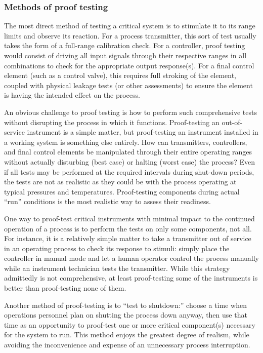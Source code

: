 \filbreak
\subsubsection{Methods of proof testing}

The most direct method of testing a critical system is to stimulate it to its range limits and observe its reaction.  For a process transmitter, this sort of test usually takes the form of a full-range calibration check.  For a controller, proof testing would consist of driving all input signals through their respective ranges in all combinations to check for the appropriate output response(s).  For a final control element (such as a control valve), this requires full stroking of the element, coupled with physical leakage tests (or other assessments) to ensure the element is having the intended effect on the process.

An obvious challenge to proof testing is how to perform such comprehensive tests without disrupting the process in which it functions.  Proof-testing an out-of-service instrument is a simple matter, but proof-testing an instrument installed in a working system is something else entirely.  How can transmitters, controllers, and final control elements be manipulated through their entire operating ranges without actually disturbing (best case) or halting (worst case) the process?  Even if all tests may be performed at the required intervals during shut-down periods, the tests are not as realistic as they could be with the process operating at typical pressures and temperatures.  Proof-testing components during actual ``run'' conditions is the most realistic way to assess their readiness.

One way to proof-test critical instruments with minimal impact to the continued operation of a process is to perform the tests on only some components, not all.  For instance, it is a relatively simple matter to take a transmitter out of service in an operating process to check its response to stimuli: simply place the controller in manual mode and let a human operator control the process manually while an instrument technician tests the transmitter.  While this strategy admittedly is not comprehensive, at least proof-testing some of the instruments is better than proof-testing none of them.

Another method of proof-testing is to ``test to shutdown:'' choose a time when operations personnel plan on shutting the process down anyway, then use that time as an opportunity to proof-test one or more critical component(s) necessary for the system to run.  This method enjoys the greatest degree of realism, while avoiding the inconvenience and expense of an unnecessary process interruption.

